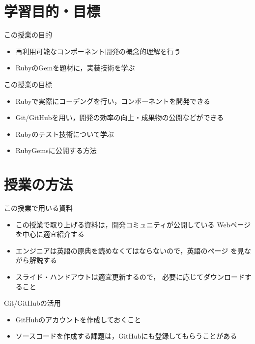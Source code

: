 \documentclass[t, aspectratio=169]{beamer}
\begin{document}
\section{学習目的・目標}
\label{sec-1-2}
\begin{frame}[label=sec-1-2-1]{この授業の目的}
\begin{itemize}
\item 再利用可能なコンポーネント開発の概念的理解を行う
\item RubyのGemを題材に，実装技術を学ぶ
\end{itemize}
\end{frame}
\begin{frame}[label=sec-1-2-2]{この授業の目標}
\begin{itemize}
\item Rubyで実際にコーデングを行い，コンポーネントを開発できる
\item Git/GitHubを用い，開発の効率の向上・成果物の公開などができる
\item Rubyのテスト技術について学ぶ
\item RubyGemsに公開する方法
\end{itemize}
\end{frame}

\section{授業の方法}
\label{sec-1-3}
\begin{frame}[label=sec-1-3-1]{この授業で用いる資料}
\begin{itemize}
\item この授業で取り上げる資料は，開発コミュニティが公開している
Webページを中心に適宜紹介する
\item エンジニアは英語の原典を読めなくてはならないので，英語のページ
を見ながら解説する
\item スライド・ハンドアウトは適宜更新するので，
必要に応じてダウンロードすること
\end{itemize}
\end{frame}

\begin{frame}[label=sec-1-3-2]{Git/GitHubの活用}
\begin{itemize}
\item GitHubのアカウントを作成しておくこと
\item ソースコードを作成する課題は，GitHubにも登録してもらうことがある
\end{itemize}
\end{frame}
\end{document}

